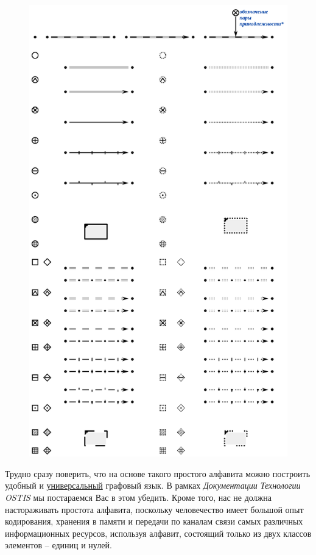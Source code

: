 \begin{figure}[h]
	\centering
	\includegraphics[scale=0.8]{images/intro/scg/SCg-full.png}
\end{figure}


\bigskip
Трудно сразу поверить, что на основе такого простого алфавита можно построить удобный и \uline{универсальный} графовый язык. В рамках \textit{Документации Технологии OSTIS} мы постараемся Вас в этом убедить. Кроме того, нас не должна настораживать простота алфавита, поскольку человечество имеет большой опыт кодирования, хранения в памяти и передачи по каналам связи самых различных информационных ресурсов, используя алфавит, состоящий только из двух классов элементов -- единиц и нулей. 

